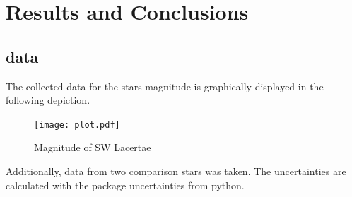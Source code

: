 \section{Results and Conclusions}
\label{sec:make}

\subsection{data}
  \label{sec:America}
  The collected data for the stars magnitude is graphically displayed in the following depiction.
  \begin{figure}[H]
    \centering
    \texttt{[image: plot.pdf]}
    \caption{Magnitude of SW Lacertae}
  \end{figure}
  Additionally, data from two comparison stars was taken.
  The uncertainties are calculated with the package uncertainties from python.

